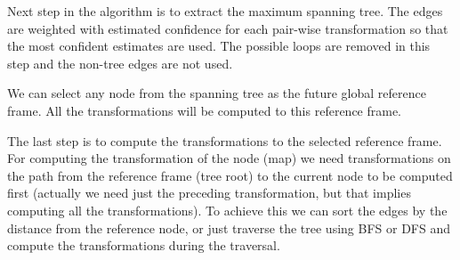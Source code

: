 Next step in the algorithm is to extract the maximum spanning tree. The edges are weighted with estimated confidence for each pair-wise transformation so that the most confident estimates are used. The possible loops are removed in this step and the non-tree edges are not used.

We can select any node from the spanning tree as the future global reference frame. All the transformations will be computed to this reference frame.

The last step is to compute the transformations to the selected reference frame. For computing the transformation of the node (map) we need transformations on the path from the reference frame (tree root) to the current node to be computed first (actually we need just the preceding transformation, but that implies computing all the transformations). To achieve this we can sort the edges by the distance from the reference node, or just traverse the tree using \gls{BFS} or \gls{DFS} and compute the transformations during the traversal.


